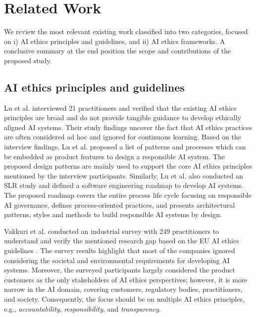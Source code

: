 \section{Related Work}
We review the most relevant existing work classified into  two categories, focused on i) AI ethics principles and guidelines, and ii) AI ethics frameworks. A conclusive summary at the end position the scope and contributions of the proposed study.

\subsection{AI ethics principles and guidelines }
Lu et al. \cite{lu2022software} interviewed 21 practitioners and verified that the existing AI ethics principles are broad and do not provide tangible guidance to develop ethically aligned AI systems. Their study findings uncover the fact that AI ethics practices are often considered ad hoc and ignored for continuous learning. Based on the interview findings, Lu et al. \cite{lu2022software} proposed a list of patterns and processes which can be embedded as product features to design a responsible AI system. The proposed design patterns are mainly used to support the core AI ethics principles mentioned by the interview participants. Similarly, Lu et al. \cite{lu2022towards} also conducted an SLR study and defined a software engineering roadmap to develop AI systems. The proposed roadmap covers the entire process life cycle focusing on responsible AI governance, defines process-oriented practices, and presents architectural patterns, styles and methods to build responsible AI systems by design.

Vakkuri et al. \cite{vakkuri2022software} conducted an industrial survey with 249 practitioners to understand and verify the mentioned research gap based on the EU AI ethics guidelines \cite{AR2}. The survey results highlight that most of the companies ignored considering the societal and environmental requirements for developing AI systems. Moreover, the surveyed participants largely considered the product customers as the only stakeholders of AI ethics perspectives; however, it is more narrow in the AI domain, covering customers, regulatory bodies, practitioners, and society. Consequently, the focus should be on multiple AI ethics principles, e.g., \textit{accountability}, \textit{responsibility}, and \textit{transparency}.

